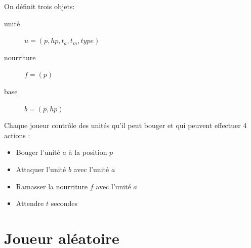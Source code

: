 \documentclass[a4paper, 11pt]{article}
\theoremstyle{definition}
\begin{document}
\newpage
On définit trois objets:
\begin{description}
    \item[unité] $u = (p, hp, t_a, t_m, type)$
    \item[nourriture] $f = (p)$
    \item[base] $b = (p, hp)$
\end{description}

Chaque joueur contrôle des unités qu'il peut bouger et qui peuvent effectuer 4
actions :
\begin{itemize}
    \item Bouger l'unité $a$ à la position $p$
    \item Attaquer l'unité $b$ avec l'unité $a$
    \item Ramasser la nourriture $f$ avec l'unité $a$
    \item Attendre $t$ secondes
\end{itemize}

\section*{Joueur aléatoire}
\end{document}
